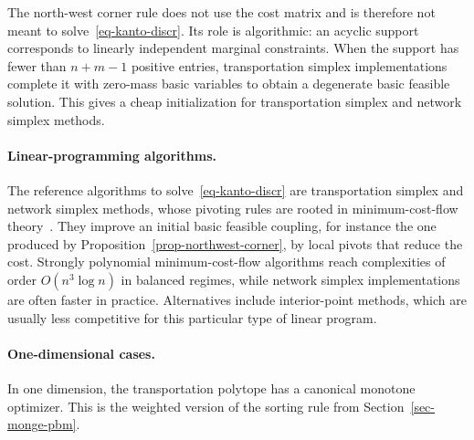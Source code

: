 The north-west corner rule does not use the cost matrix and is therefore not meant to solve~\eqref{eq-kanto-discr}. Its role is algorithmic: an acyclic support corresponds to linearly independent marginal constraints. When the support has fewer than $n+m-1$ positive entries, transportation simplex implementations complete it with zero-mass basic variables to obtain a degenerate basic feasible solution. This gives a cheap initialization for transportation simplex and network simplex methods.

\paragraph{Linear-programming algorithms.}

The reference algorithms to solve~\eqref{eq-kanto-discr} are transportation simplex and network simplex methods, whose pivoting rules are rooted in minimum-cost-flow theory~\cite{Dantzig51,bertsekas1988dual,Orlin1997}. They improve an initial basic feasible coupling, for instance the one produced by Proposition~\ref{prop-northwest-corner}, by local pivots that reduce the cost. Strongly polynomial minimum-cost-flow algorithms reach complexities of order $O(n^3\log n)$ in balanced regimes, while network simplex implementations are often faster in practice. Alternatives include interior-point methods, which are usually less competitive for this particular type of linear program.

\paragraph{One-dimensional cases.}

In one dimension, the transportation polytope has a canonical monotone optimizer. This is the weighted version of the sorting rule from Section~\ref{sec-monge-pbm}.

